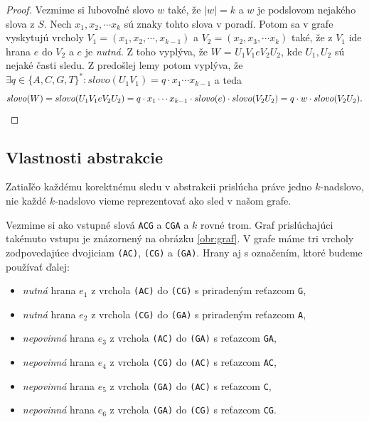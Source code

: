\begin{proof}
Vezmime si ľubovoľné slovo $w$ také, že $|w| = k$ a $w$ je podslovom nejakého slova z $S$. Nech $x_1, x_2, \cdots x_k$
sú znaky tohto slova v poradí. Potom sa v grafe vyskytujú vrcholy $V_1 = (x_1, x_2, \cdots, x_{k-1})$ a $V_2 = (x_2, x_3, \cdots x_k)$ také,
že z $V_1$ ide hrana $e$ do $V_2$ a $e$ je \emph{nutná}. Z toho vyplýva, že $W$ = $U_1 V_1 e V_2 U_2$, kde $U_1, U_2$ sú nejaké časti sledu.
Z predošlej lemy potom vyplýva, že $\exists q \in \{A,C,G,T \}^*: slovo(U_1 V_1) =  q \cdot x_1 \cdots x_{k - 1}$ a teda
$$slovo(W) = slovo(U_1 V_1 e V_2 U_2) = q \cdot x_1 \cdots x_{k - 1} \cdot slovo(e) \cdot slovo (V_2 U_2) = q \cdot w \cdot slovo(V_2 U_2).\qedhere$$
\end{proof}

\subsection{Vlastnosti abstrakcie}

Zatiaľčo každému korektnému sledu v abstrakcii prislúcha práve jedno $k$-nadslovo, nie
každé $k$-nadslovo vieme reprezentovať ako sled v našom grafe.

Vezmime si ako vstupné slová \verb_ACG_ a \verb_CGA_ a $k$ rovné trom. Graf prislúchajúci
takémuto vstupu je znázornený na obrázku \ref{obr:graf}.
V grafe máme tri vrcholy zodpovedajúce dvojiciam \verb_(AC)_, \verb_(CG)_ a
\verb_(GA)_. Hrany aj s označením, ktoré budeme používať ďalej: 
\begin{itemize}
    \item \emph{nutná} hrana $e_1$ z vrchola \verb_(AC)_ do \verb_(CG)_ s priradeným reťazcom \verb_G_,
    \item \emph{nutná} hrana $e_2$ z vrchola \verb_(CG)_ do \verb_(GA)_ s priradeným reťazcom \verb_A_,
    \item \emph{nepovinná} hrana $e_3$ z vrchola \verb_(AC)_ do \verb_(GA)_ s reťazcom \verb_GA_,
    \item \emph{nepovinná} hrana $e_4$ z vrchola \verb_(CG)_ do \verb_(AC)_ s reťazcom \verb_AC_,
    \item \emph{nepovinná} hrana $e_5$ z vrchola \verb_(GA)_ do \verb_(AC)_ s reťazcom \verb_C_,
    \item \emph{nepovinná} hrana $e_6$ z vrchola \verb_(GA)_ do \verb_(CG)_ s reťazcom \verb_CG_.
\end{itemize}

